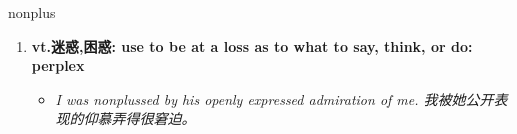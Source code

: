 
\begin{frame}
{\huge nonplus}
\begin{center}
\begin{enumerate}\Large
  \item \textbf{vt.迷惑,困惑: use to be at a loss as to what to say, think, or do: perplex}
  \begin{itemize}
    \item \em{\Large{I was nonplussed by his openly expressed admiration of me. 我被她公开表现的仰慕弄得很窘迫。}}
  \end{itemize}
\end{enumerate}
\end{center}
\end{frame}
